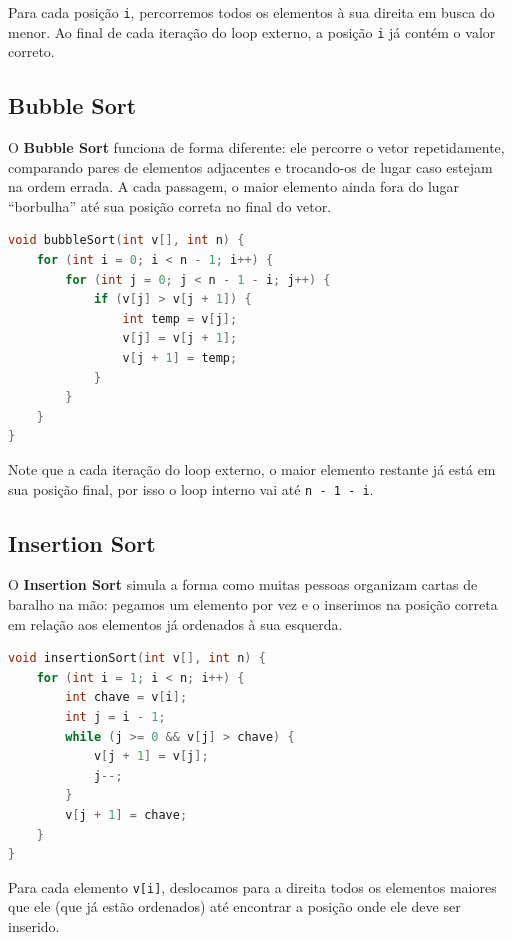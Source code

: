 \documentclass[12pt]{article}
\begin{document}
Para cada posição \texttt{i}, percorremos todos os elementos à sua direita em busca do menor. Ao final de cada iteração do loop externo, a posição \texttt{i} já contém o valor correto.

\subsection{Bubble Sort}

O \textbf{Bubble Sort} funciona de forma diferente: ele percorre o vetor repetidamente, comparando pares de elementos adjacentes e trocando-os de lugar caso estejam na ordem errada. A cada passagem, o maior elemento ainda fora do lugar ``borbulha'' até sua posição correta no final do vetor.

\begin{lstlisting}[language=C++]
void bubbleSort(int v[], int n) {
    for (int i = 0; i < n - 1; i++) {
        for (int j = 0; j < n - 1 - i; j++) {
            if (v[j] > v[j + 1]) {
                int temp = v[j];
                v[j] = v[j + 1];
                v[j + 1] = temp;
            }
        }
    }
}
\end{lstlisting}

Note que a cada iteração do loop externo, o maior elemento restante já está em sua posição final, por isso o loop interno vai até \texttt{n - 1 - i}.

\subsection{Insertion Sort}

O \textbf{Insertion Sort} simula a forma como muitas pessoas organizam cartas de baralho na mão: pegamos um elemento por vez e o inserimos na posição correta em relação aos elementos já ordenados à sua esquerda.

\begin{lstlisting}[language=C++]
void insertionSort(int v[], int n) {
    for (int i = 1; i < n; i++) {
        int chave = v[i];
        int j = i - 1;
        while (j >= 0 && v[j] > chave) {
            v[j + 1] = v[j];
            j--;
        }
        v[j + 1] = chave;
    }
}
\end{lstlisting}

Para cada elemento \texttt{v[i]}, deslocamos para a direita todos os elementos maiores que ele (que já estão ordenados) até encontrar a posição onde ele deve ser inserido.

\end{document}
